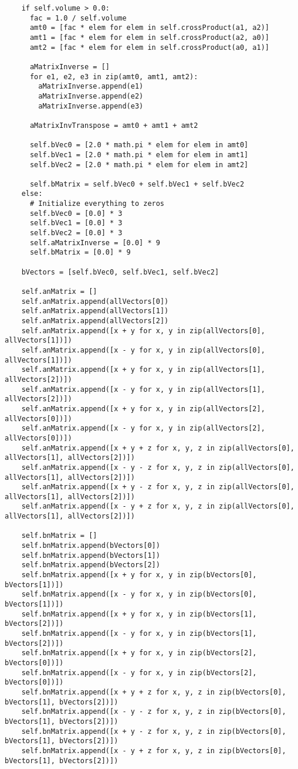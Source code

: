\begin{verbatim}
    if self.volume > 0.0:
      fac = 1.0 / self.volume
      amt0 = [fac * elem for elem in self.crossProduct(a1, a2)]
      amt1 = [fac * elem for elem in self.crossProduct(a2, a0)]
      amt2 = [fac * elem for elem in self.crossProduct(a0, a1)]
      
      aMatrixInverse = []
      for e1, e2, e3 in zip(amt0, amt1, amt2):
        aMatrixInverse.append(e1)
        aMatrixInverse.append(e2)
        aMatrixInverse.append(e3)
        
      aMatrixInvTranspose = amt0 + amt1 + amt2
      
      self.bVec0 = [2.0 * math.pi * elem for elem in amt0]
      self.bVec1 = [2.0 * math.pi * elem for elem in amt1]
      self.bVec2 = [2.0 * math.pi * elem for elem in amt2]
      
      self.bMatrix = self.bVec0 + self.bVec1 + self.bVec2
    else:
      # Initialize everything to zeros
      self.bVec0 = [0.0] * 3
      self.bVec1 = [0.0] * 3
      self.bVec2 = [0.0] * 3
      self.aMatrixInverse = [0.0] * 9
      self.bMatrix = [0.0] * 9
    
    bVectors = [self.bVec0, self.bVec1, self.bVec2]
    
    self.anMatrix = []
    self.anMatrix.append(allVectors[0])
    self.anMatrix.append(allVectors[1])
    self.anMatrix.append(allVectors[2])
    self.anMatrix.append([x + y for x, y in zip(allVectors[0], allVectors[1])])
    self.anMatrix.append([x - y for x, y in zip(allVectors[0], allVectors[1])])
    self.anMatrix.append([x + y for x, y in zip(allVectors[1], allVectors[2])])
    self.anMatrix.append([x - y for x, y in zip(allVectors[1], allVectors[2])])
    self.anMatrix.append([x + y for x, y in zip(allVectors[2], allVectors[0])])
    self.anMatrix.append([x - y for x, y in zip(allVectors[2], allVectors[0])])
    self.anMatrix.append([x + y + z for x, y, z in zip(allVectors[0], allVectors[1], allVectors[2])])
    self.anMatrix.append([x - y - z for x, y, z in zip(allVectors[0], allVectors[1], allVectors[2])])
    self.anMatrix.append([x + y - z for x, y, z in zip(allVectors[0], allVectors[1], allVectors[2])])
    self.anMatrix.append([x - y + z for x, y, z in zip(allVectors[0], allVectors[1], allVectors[2])])
    
    self.bnMatrix = []
    self.bnMatrix.append(bVectors[0])
    self.bnMatrix.append(bVectors[1])
    self.bnMatrix.append(bVectors[2])
    self.bnMatrix.append([x + y for x, y in zip(bVectors[0], bVectors[1])])
    self.bnMatrix.append([x - y for x, y in zip(bVectors[0], bVectors[1])])
    self.bnMatrix.append([x + y for x, y in zip(bVectors[1], bVectors[2])])
    self.bnMatrix.append([x - y for x, y in zip(bVectors[1], bVectors[2])])
    self.bnMatrix.append([x + y for x, y in zip(bVectors[2], bVectors[0])])
    self.bnMatrix.append([x - y for x, y in zip(bVectors[2], bVectors[0])])
    self.bnMatrix.append([x + y + z for x, y, z in zip(bVectors[0], bVectors[1], bVectors[2])])
    self.bnMatrix.append([x - y - z for x, y, z in zip(bVectors[0], bVectors[1], bVectors[2])])
    self.bnMatrix.append([x + y - z for x, y, z in zip(bVectors[0], bVectors[1], bVectors[2])])
    self.bnMatrix.append([x - y + z for x, y, z in zip(bVectors[0], bVectors[1], bVectors[2])])
         

\end{verbatim}
